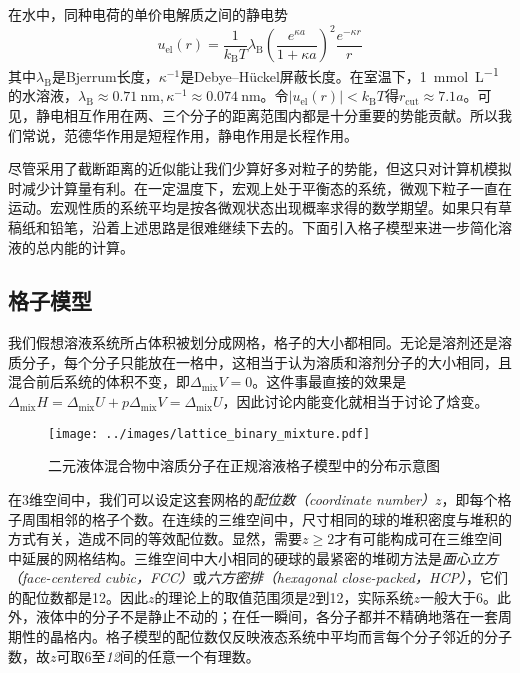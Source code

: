 \documentclass[main.tex]{subfiles}
\begin{document}
在水中，同种电荷的单价电解质之间的静电势
\[u_\text{el}\left(r\right)=\frac{1}{k_\text{B}T}\lambda_\text{B}\left(\frac{e^{\kappa a}}{1+\kappa a}\right)^2\frac{e^{-\kappa r}}{r}\]
其中$\lambda_\text{B}$是Bjerrum长度，$\kappa^{-1}$是Debye--Hückel屏蔽长度。在室温下，\qty{1}{\milli\mole\per\liter}的水溶液，$\lambda_\text{B}\approx\qty{0.71}{\nano\meter},\kappa^{-1}\approx\qty{0.074}{\nano\meter}$。令$\left|u_\text{el}\left(r\right)\right|<k_\text{B}T$得$r_\text{cut}\approx \num{7.1}a$。可见，静电相互作用在两、三个分子的距离范围内都是十分重要的势能贡献。所以我们常说，范德华作用是短程作用，静电作用是长程作用。

尽管采用了截断距离的近似能让我们少算好多对粒子的势能，但这只对计算机模拟时减少计算量有利。在一定温度下，宏观上处于平衡态的系统，微观下粒子一直在运动。宏观性质的系统平均是按各微观状态出现概率求得的数学期望。如果只有草稿纸和铅笔，沿着上述思路是很难继续下去的。下面引入格子模型来进一步简化溶液的总内能的计算。

\subsection{格子模型}
我们假想溶液系统所占体积被划分成网格，格子的大小都相同。无论是溶剂还是溶质分子，每个分子只能放在一格中，这相当于认为溶质和溶剂分子的大小相同，且混合前后系统的体积不变，即$\Delta_\text{mix}V=0$。这件事最直接的效果是$\Delta_\text{mix}H=\Delta_\text{mix}U+p\Delta_\text{mix}V=\Delta_\text{mix}U$，因此讨论内能变化就相当于讨论了焓变。

\begin{wrapfigure}{r}{0.333\textwidth}
  \centering
  \texttt{[image: ../images/lattice\_binary\_mixture.pdf]}
  \caption{二元液体混合物中溶质分子在正规溶液格子模型中的分布示意图}
  \label{fig:lattice_binary_mixture}
\end{wrapfigure}

在3维空间中，我们可以设定这套网格的\emph{配位数（coordinate number）}$z$，即每个格子周围相邻的格子个数。在连续的三维空间中，尺寸相同的球的堆积密度与堆积的方式有关，造成不同的等效配位数。显然，需要$z\geq 2$才有可能构成可在三维空间中延展的网格结构。三维空间中大小相同的硬球的最紧密的堆砌方法是\emph{面心立方（face-centered cubic，FCC）}或\emph{六方密排（hexagonal close-packed，HCP）}，它们的配位数都是\num{12}。因此$z$的理论上的取值范围须是\num{2}到\num{12}，实际系统$z$一般大于\num{6}。此外，液体中的分子不是静止不动的；在任一瞬间，各分子都并不精确地落在一套周期性的晶格内。格子模型的配位数仅反映液态系统中平均而言每个分子邻近的分子数，故$z$可取\num{6}至\emph{12}间的任意一个有理数。
\end{document}
